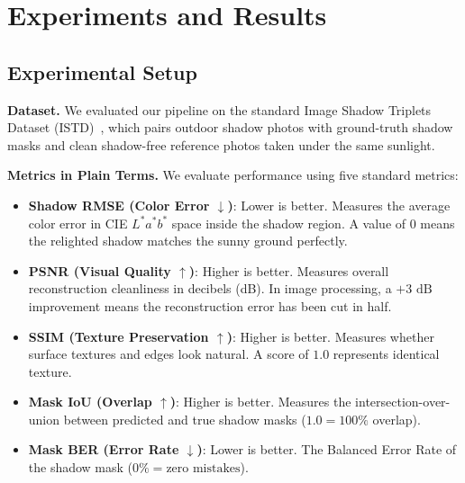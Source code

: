 \documentclass[10pt,twocolumn,letterpaper]{article}
\begin{document}
\section{Experiments and Results}
\label{sec:experiments}

\subsection{Experimental Setup}
\textbf{Dataset.} We evaluated our pipeline on the standard Image Shadow Triplets Dataset (ISTD)~\cite{wang2018stacked}, which pairs outdoor shadow photos with ground-truth shadow masks and clean shadow-free reference photos taken under the same sunlight.

\textbf{Metrics in Plain Terms.} We evaluate performance using five standard metrics:
\begin{itemize}
    \item \textbf{Shadow RMSE (Color Error $\downarrow$)}: Lower is better. Measures the average color error in CIE $L^*a^*b^*$ space inside the shadow region. A value of 0 means the relighted shadow matches the sunny ground perfectly.
    \item \textbf{PSNR (Visual Quality $\uparrow$)}: Higher is better. Measures overall reconstruction cleanliness in decibels (dB). In image processing, a $+3\text{ dB}$ improvement means the reconstruction error has been cut in half.
    \item \textbf{SSIM (Texture Preservation $\uparrow$)}: Higher is better. Measures whether surface textures and edges look natural. A score of $1.0$ represents identical texture.
    \item \textbf{Mask IoU (Overlap $\uparrow$)}: Higher is better. Measures the intersection-over-union between predicted and true shadow masks ($1.0 = 100\%$ overlap).
    \item \textbf{Mask BER (Error Rate $\downarrow$)}: Lower is better. The Balanced Error Rate of the shadow mask ($0\% = \text{zero mistakes}$).
\end{itemize}
\end{document}
